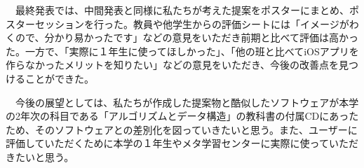 \documentclass[openany,11pt,papersize]{jsbook}
\begin{document}
\begin{jabstract}
　最終発表では、中間発表と同様に私たちが考えた提案をポスターにまとめ、ポスターセッションを行った。教員や他学生からの評価シートには「イメージがわくので、分かり易かったです」などの意見をいただき前期と比べて評価は高かった。一方で、「実際に１年生に使ってほしかった」、「他の班と比べてiOSアプリを作らなかったメリットを知りたい」などの意見をいただき、今後の改善点を見つけることができた。

　今後の展望としては、私たちが作成した提案物と酷似したソフトウェアが本学の2年次の科目である「アルゴリズムとデータ構造」の教科書の付属CDにあったため、そのソフトウェアとの差別化を図っていきたいと思う。また、ユーザーに評価していただくために本学の１年生やメタ学習センターに実際に使っていただきたいと思う。

\end{jabstract}
\end{document}
